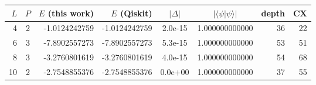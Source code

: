 \begin{tabular}{r c r r c c r r}
\toprule
$L$ & $P$ & $E$ (this work) & $E$ (Qiskit) & $|\Delta|$ & $|\langle\psi|\psi\rangle|$ & depth & CX \\
\midrule
4 & 2 & -1.0124242759 & -1.0124242759 & 2.0e-15 & 1.000000000000 & 36 & 22 \\
6 & 3 & -7.8902557273 & -7.8902557273 & 5.3e-15 & 1.000000000000 & 53 & 51 \\
8 & 3 & -3.2760801619 & -3.2760801619 & 4.0e-15 & 1.000000000000 & 54 & 68 \\
10 & 2 & -2.7548855376 & -2.7548855376 & 0.0e+00 & 1.000000000000 & 37 & 55 \\
\bottomrule
\end{tabular}
